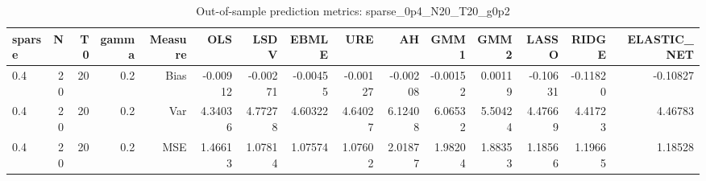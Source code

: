 \begin{table}[!htbp]\centering
\caption{Out-of-sample prediction metrics: sparse_0p4_N20_T20_g0p2}
\label{tab:table3_sparse_0p4_N20_T20_g0p2}
\begin{tabular}{lrrrrrrrrrrrrrr}
\hline
sparse & N & T0 & gamma & Measure & OLS & LSDV & EBMLE & URE & AH & GMM1 & GMM2 & LASSO & RIDGE & ELASTIC_NET \\
\hline
0.4 & 20 & 20 & 0.2 & Bias & -0.00912 & -0.00271 & -0.00455 & -0.00127 & -0.00208 & -0.00152 & 0.00119 & -0.10631 & -0.11820 & -0.10827 \\
0.4 & 20 & 20 & 0.2 & Var & 4.34036 & 4.77278 & 4.60322 & 4.64027 & 6.12408 & 6.06532 & 5.50424 & 4.47669 & 4.41723 & 4.46783 \\
0.4 & 20 & 20 & 0.2 & MSE & 1.46613 & 1.07814 & 1.07574 & 1.07602 & 2.01877 & 1.98204 & 1.88353 & 1.18566 & 1.19665 & 1.18528 \\
\hline
\end{tabular}
\end{table}

